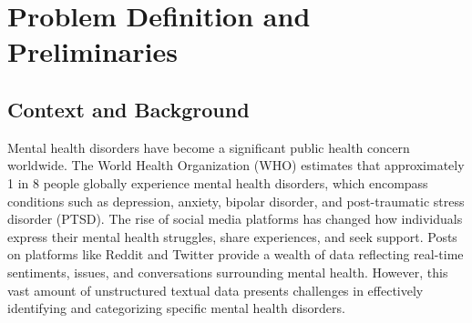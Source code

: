 
\section{Problem Definition and Preliminaries}

\begin{comment}
    State the problem you have solved. Define the boundaries of your project. What was included (scope) and what was not (exclusions)?
\vspace{.1in}

\noindent
Briefly explain the methods you used to conduct your research or complete the project. Were there specific tools, techniques or libraries employed?
\end{comment}

\subsection{Context and Background}
\noindent
Mental health disorders have become a significant public health concern worldwide. The World Health Organization (WHO) estimates that approximately 1 in 8 people globally experience mental health disorders, which encompass conditions such as depression, anxiety, bipolar disorder, and post-traumatic stress disorder (PTSD). The rise of social media platforms has changed how individuals express their mental health struggles, share experiences, and seek support. Posts on platforms like Reddit and Twitter provide a wealth of data reflecting real-time sentiments, issues, and conversations surrounding mental health. However, this vast amount of unstructured textual data presents challenges in effectively identifying and categorizing specific mental health disorders.

